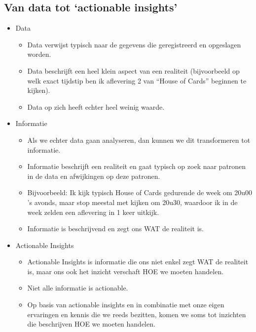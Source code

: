 \documentclass[]{tufte-book}
\providecommand{\tightlist}{%
  \setlength{\itemsep}{0pt}\setlength{\parskip}{0pt}}
\begin{document}
\hypertarget{van-data-tot-actionable-insights}{%
\subsection{Van data tot `actionable insights'}\label{van-data-tot-actionable-insights}}

\begin{itemize}
\tightlist
\item
  Data

  \begin{itemize}
  \tightlist
  \item
    Data verwijst typisch naar de gegevens die geregistreerd en opgeslagen worden.
  \item
    Data beschrijft een heel klein aspect van een realiteit (bijvoorbeeld op welk exact tijdstip ben ik aflevering 2 van ``House of Cards'' beginnen te kijken).
  \item
    Data op zich heeft echter heel weinig waarde.
  \end{itemize}
\item
  Informatie

  \begin{itemize}
  \tightlist
  \item
    Als we echter data gaan analyseren, dan kunnen we dit transformeren tot informatie.
  \item
    Informatie beschrijft een realiteit en gaat typisch op zoek naar patronen in de data en afwijkingen op deze patronen.
  \item
    Bijvoorbeeld: Ik kijk typisch House of Cards gedurende de week om 20u00 's avonds, maar stop meestal met kijken om 20u30, waardoor ik in de week zelden een aflevering in 1 keer uitkijk.
  \item
    Informatie is beschrijvend en zegt ons WAT de realiteit is.
  \end{itemize}
\item
  Actionable Insights

  \begin{itemize}
  \tightlist
  \item
    Actionable Insights is informatie die ons niet enkel zegt WAT de realiteit is, maar ons ook het inzicht verschaft HOE we moeten handelen.
  \item
    Niet alle informatie is actionable.
  \item
    Op basis van actionable insights en in combinatie met onze eigen ervaringen en kennis die we reeds bezitten, komen we soms tot inzichten die beschrijven HOE we moeten handelen.
  \end{itemize}
\end{itemize}
\end{document}
